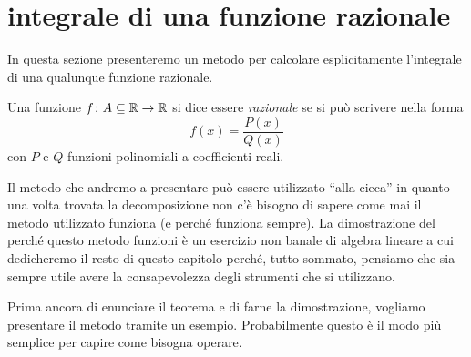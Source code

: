 \section{integrale di una funzione razionale}
%
In questa sezione presenteremo un metodo per
calcolare esplicitamente l'integrale di una qualunque funzione razionale.

\begin{definition}
Una funzione $f\colon A \subseteq {\mathbb R} \to {\mathbb R}$
si dice essere \emph{razionale} se si può scrivere nella forma
\[
  f(x) = \frac{P(x)}{Q(x)}
\]
con $P$ e $Q$ funzioni polinomiali a coefficienti reali.
\end{definition}

Il metodo che andremo a presentare può essere utilizzato ``alla cieca'' in
quanto una volta trovata la decomposizione non c'è bisogno di sapere
come mai il metodo utilizzato funziona (e perché funziona sempre).
La dimostrazione del perché questo metodo funzioni è un esercizio non
banale di algebra lineare a cui dedicheremo il resto di questo capitolo
perché, tutto sommato, pensiamo che sia sempre utile avere la consapevolezza degli strumenti che si utilizzano.

Prima ancora di enunciare il teorema e di farne la dimostrazione,
vogliamo presentare il metodo tramite un esempio. Probabilmente questo è il modo più semplice per capire come bisogna operare.

